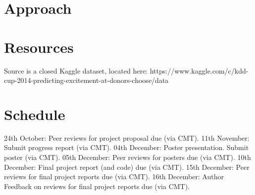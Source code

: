 \documentclass{article}
\begin{document}
 
\section{Approach}


\section{Resources}
Source is a closed Kaggle dataset, located here: https://www.kaggle.com/c/kdd-cup-2014-predicting-excitement-at-donors-choose/data

\section{Schedule}



24th October: Peer reviews for project proposal due (via CMT).
11th November: Submit progress report (via CMT).
04th December: Poster presentation. Submit poster (via CMT).
05th December: Peer reviews for posters due (via CMT).
10th December: Final project report (and code) due (via CMT).
15th December: Peer reviews for final project reports due (via CMT).
16th December: Author Feedback on reviews for final project reports due (via CMT).
\end{document}
